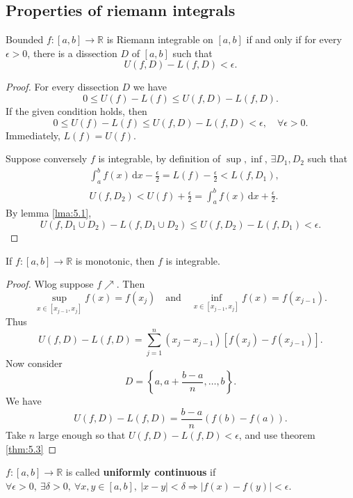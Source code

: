 \subsection{Properties of riemann integrals}
\begin{theorem}\label{thm:5.3}
    Bounded $f:[a,b]\to\mathbb R$ is Riemann integrable on $[a,b]$ if and only if for every $\epsilon>0$, there is a dissection $D$ of $[a,b]$ such that 
    \[
        U(f,D)-L(f,D)<\epsilon.
    \]
\end{theorem}
\begin{proof}
    For every dissection $ D $ we have 
    \[
        0\le U(f)-L(f)\le U(f,D)-L(f,D).
    \]
    If the given condition holds, then 
    \[
        0\le U(f)-L(f)\le U(f,D)-L(f,D)<\epsilon,\quad \forall \epsilon>0.
    \]
    Immediately, $ L(f)=U(f) $.

    Suppose conversely $ f $ is integrable, by definition of $ \sup ,\inf  $, $ \exists D_1,D_2 $ such that 
    \begin{align*}
        &\int_{a}^{b} f(x) \,\mathrm{d}x -\frac{\epsilon}{2} = L(f)-\frac{\epsilon}{2} < L(f,D_1),\\ 
        &U(f,D_2)<U(f)+\frac{\epsilon}{2}=\int_{a}^{b} f(x) \,\mathrm{d}x+\frac{\epsilon}{2}.
    \end{align*}
    By lemma \ref{lma:5.1}, 
    \[
        U(f,D_1 \cup D_2)-L(f,D_1 \cup D_2)\le U(f,D_2)-L(f,D_1)<\epsilon.
    \]
\end{proof}
\begin{theorem}\label{thm:5.4}
    If $ f:[a,b]\to \mathbb{R} $ is monotonic, then $f$ is integrable.
\end{theorem}
\begin{proof}
    Wlog suppose $ f \nearrow $. Then
    \[
        \sup_{x\in [x_{j-1},x_j]}f(x)=f(x_j)\quad \text{and}\quad \inf_{x\in [x_{j-1},x_j]}f(x)=f(x_{j-1}).
    \]
    Thus 
    \[
        U(f,D)-L(f,D) = \sum_{j=1}^{n}(x_j-x_{j-1})[f(x_j)-f(x_{j-1})].
    \]
    Now consider 
    \[
        D = \left\{ a,a+\frac{b-a}{n},\dots,b \right\}.
    \]
    We have 
    \[
        U(f,D)-L(f,D)=\frac{b-a}{n}(f(b)-f(a)).
    \]
    Take $n$ large enough so that $ U(f,D)-L(f,D)<\epsilon $, and use theorem \ref{thm:5.3}
\end{proof}
\begin{definition}
    $ f:[a,b]\to \mathbb{R} $ is called \textbf{uniformly continuous} if $ \forall \epsilon>0,\ \exists \delta>0,\ \forall x,y\in [a,b],\ |x-y|<\delta \Rightarrow |f(x)-f(y)|<\epsilon $.
\end{definition}
